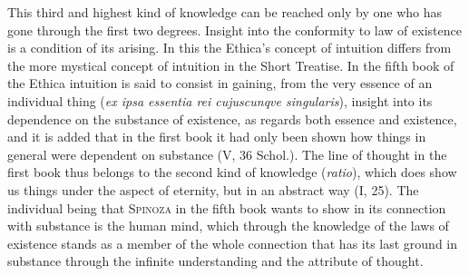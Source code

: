 \documentclass[12pt]{article}
\newcommand{\opage}[1]{\marginnote{\footnotesize\textit{[#1]}}}
\begin{document}
This third and highest kind of knowledge can be reached only by one who has gone through the
first two degrees. Insight into the conformity to law of existence is a condition of its
arising. In this the Ethica's concept of intuition differs from the more mystical concept of
intuition in the Short Treatise. In the fifth book of the Ethica intuition is said to consist
in gaining, from the very essence of an individual thing (\textit{ex ipsa essentia rei
cujuscunqve singularis}), insight into its dependence on the substance of existence, as
regards both essence and existence, and it is added that in the first book it had only been
shown how things in general were dependent on substance (V, 36 Schol.). \opage{52}The line of
thought in the first book thus belongs to the second kind of knowledge (\textit{ratio}),
which does show us things under the aspect of eternity, but in an abstract way (I, 25). The
individual being that \textsc{Spinoza} in the fifth book wants to show in its connection with
substance is the human mind, which through the knowledge of the laws of existence stands as a
member of the whole connection that has its last ground in substance through the infinite
understanding and the attribute of thought.
\end{document}
